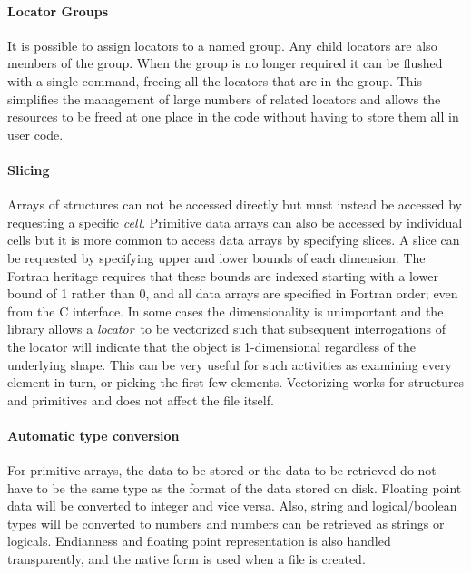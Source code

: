 \documentclass[final,authoryear,5p,times,twocolumn]{elsarticle}
\newcommand{\locator}{\emph{locator}}
\begin{document}
\paragraph{Locator Groups}

It is possible to assign locators to a named group. Any child locators
are also members of the group. When the group is no longer required it
can be flushed with a single command, freeing all the locators that
are in the group. This simplifies the management of large numbers
of related locators and allows the resources to be freed at one place
in the code without having to store them all in user code.

\paragraph{Slicing}

Arrays of structures can not be accessed directly but must instead be
accessed by requesting a specific \emph{cell}. Primitive data arrays
can also be accessed by individual cells but it is more common to
access data arrays by specifying slices. A slice can be requested by
specifying upper and lower bounds of each dimension. The Fortran
heritage requires that these bounds are indexed starting with a lower
bound of 1 rather than 0, and all data arrays are specified in Fortran
order; even from the C interface. In some cases the dimensionality is
unimportant and the library allows a \locator\ to be vectorized such
that subsequent interrogations of the locator will indicate that the
object is 1-dimensional regardless of the underlying shape. This can
be very useful for such activities as examining every element in turn,
or picking the first few elements. Vectorizing works for structures
and primitives and does not affect the file itself.

\paragraph{Automatic type conversion}

For primitive arrays, the data to be stored or the data to be
retrieved do not have to be the same type as the format of the data
stored on disk. Floating point data will be converted to integer and
vice versa. Also, string and logical/boolean types will be converted
to numbers and numbers can be retrieved as strings or
logicals. Endianness and floating point representation is also handled
transparently, and the native form is used when a file is created.
\end{document}
